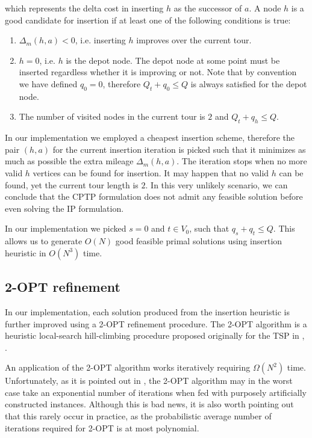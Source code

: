 which represents the delta cost in inserting $h$ as the successor of $a$.
A node $h$ is a good candidate for insertion if at least one of the following conditions is true:
\begin{enumerate}
	\item $\Delta_m(h, a) < 0$, i.e. inserting $h$ improves over the current tour.
	\item $h = 0$, i.e. $h$ is the depot node. The depot node at some point must be inserted regardless whether it is improving or not.
	      Note that by convention we have defined $q_0 = 0$, therefore $Q_t + q_0 \le Q$ is always satisfied for the depot node.
	\item The number of visited nodes in the current tour is $2$ and $Q_t + q_h \le Q$.
\end{enumerate}

In our implementation we employed a cheapest insertion scheme, therefore the pair $(h, a)$ for the current insertion iteration is picked such that it minimizes as much as possible the extra mileage $\Delta_m(h, a)$.
The iteration stops when no more valid $h$ vertices can be found for insertion.
It may happen that no valid $h$ can be found, yet the current tour length is $2$.
In this very unlikely scenario, we can conclude that the CPTP formulation does not admit any feasible solution before even solving the IP formulation.

In our implementation we picked $s = 0$ and $t \in V_0$, such that $q_s + q_t \le Q$.
This allows us to generate $O(N)$ good feasible primal solutions using insertion heuristic in $O(N^3)$ time.

\subsection{2-OPT refinement}
In our implementation, each solution produced from the insertion heuristic is further improved using a 2-OPT refinement procedure.
The 2-OPT algorithm is a heuristic local-search hill-climbing procedure proposed originally for the TSP in \cite{flood_traveling-salesman_1956}, \cite{croes_method_1958}.

An application of the 2-OPT algorithm works iteratively requiring $\Omega(N^2)$ time.
Unfortunately, as it is pointed out in \cite{chandra_new_1999}, the 2-OPT algorithm may in the worst case take an exponential number of iterations when fed with purposely artificially constructed instances.
Although this is bad news, it is also worth pointing out that this rarely occur in practice, as the probabilistic average number of iterations required for 2-OPT is at most polynomial.

